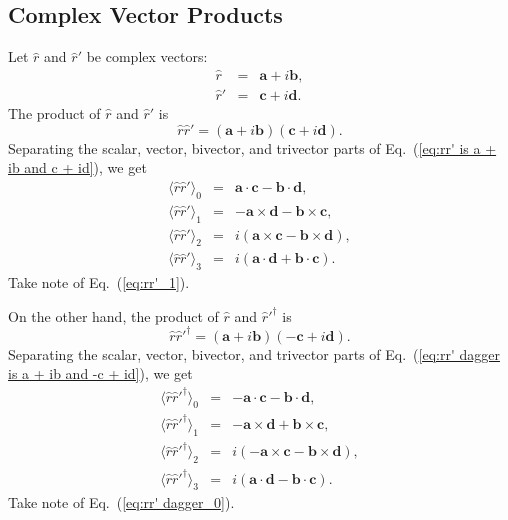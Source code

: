\documentclass[11pt,twocolumn]{article}
\begin{document}
\subsection{Complex Vector Products}

Let $\hat r$ and $\hat r'$ be complex vectors:
\begin{eqnarray}
\label{eq:r is a + ib}
\hat r&=&\mathbf a+i\mathbf b,\\
\label{eq:r' is c + id}
\hat r'&=&\mathbf c+i\mathbf d.
\end{eqnarray}
The product of $\hat r$ and $\hat r'$ is
\begin{equation}
\label{eq:rr' is a + ib and c + id}
\hat r\hat r'=(\mathbf a+i\mathbf b)(\mathbf c+i\mathbf d).
\end{equation}
Separating the scalar, vector, bivector, and trivector parts of Eq.~(\ref{eq:rr' is a + ib and c + id}), we get
\begin{eqnarray}
\label{eq:rr'_0}
\langle\hat r\hat r'\rangle_0&=&\mathbf a\cdot\mathbf c-\mathbf b\cdot\mathbf d,\\
\label{eq:rr'_1}
\langle\hat r\hat r'\rangle_1&=&-\mathbf a\times\mathbf d-\mathbf b\times\mathbf c,\\
\label{eq:rr'_2}
\langle\hat r\hat r'\rangle_2&=&i(\mathbf a\times\mathbf c-\mathbf b\times\mathbf d),\\
\label{eq:rr'_3}
\langle\hat r\hat r'\rangle_3&=&i(\mathbf a\cdot\mathbf d+\mathbf b\cdot\mathbf c).
\end{eqnarray}
Take note of Eq.~(\ref{eq:rr'_1}).

On the other hand, the product of $\hat r$ and $\hat r'^\dagger$ is
\begin{equation}
\label{eq:rr' dagger is a + ib and -c + id}
\hat r\hat r'^\dagger=(\mathbf a+i\mathbf b)(-\mathbf c+i\mathbf d).
\end{equation}
Separating the scalar, vector, bivector, and trivector parts of Eq.~(\ref{eq:rr' dagger is a + ib and -c + id}), we get
\begin{eqnarray}
\label{eq:rr' dagger_0}
\langle\hat r\hat r'^\dagger\rangle_0&=&-\mathbf a\cdot\mathbf c-\mathbf b\cdot\mathbf d,\\
\label{eq:rr' dagger_1}
\langle\hat r\hat r'^\dagger\rangle_1&=&-\mathbf a\times\mathbf d+\mathbf b\times\mathbf c,\\
\label{eq:rr' dagger_2}
\langle\hat r\hat r'^\dagger\rangle_2&=&i(-\mathbf a\times\mathbf c-\mathbf b\times\mathbf d),\\
\label{eq:rr' dagger_3}
\langle\hat r\hat r'^\dagger\rangle_3&=&i(\mathbf a\cdot\mathbf d-\mathbf b\cdot\mathbf c).
\end{eqnarray}
Take note of Eq.~(\ref{eq:rr' dagger_0}).
\end{document}
